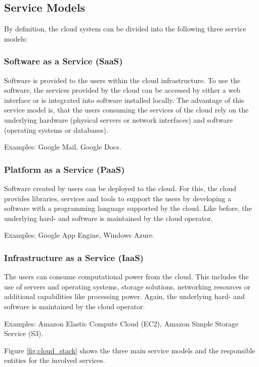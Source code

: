 \subsection{Service Models}
By definition, the cloud system can be divided into the following three service models\cite{nist}:

\subsubsection{Software as a Service (SaaS)}
Software is provided to the users within the cloud infrastructure. To use the software, the services provided by the cloud can be accessed by either a web interface or is integrated into software installed locally. The advantage of this service model is, that the users consuming the services of the cloud rely on the underlying hardware (physical servers or network interfaces) and software (operating systems or databases)\cite{nist}.
		
Examples: Google Mail, Google Docs\cite{trustedcloudcomputing}.

\subsubsection{Platform as a Service (PaaS)}
Software created by users can be deployed to the cloud. For this, the cloud provides libraries, services and tools to support the users by developing a software with a programming language supported by the cloud. Like before, the underlying hard- and software is maintained by the cloud operator\cite{nist}.
	
Examples: Google App Engine, Windows Azure\cite{trustedcloudcomputing}. 

\subsubsection{Infrastructure as a Service (IaaS)}
The users can consume computational power from the cloud. This includes the use of servers and operating systems, storage solutions, networking resources or additional capabilities like processing power. Again, the underlying hard- and software is maintained by the cloud operator\cite{nist}.
	
Examples: Amazon Elastic Compute Cloud (EC2), Amazon Simple Storage Service (S3)\cite{trustedcloudcomputing}.

Figure \ref{fig:cloud_stack} shows the three main service models and the responsible entities for the involved services.


